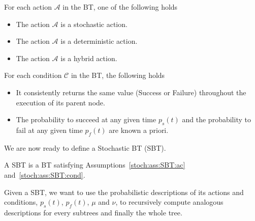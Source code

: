 \begin{assumption}
\label{stoch:ass:SBT:ac}
For each action $\mathcal{A}$ in the BT, one of the following holds
\begin{itemize}
\item The action $\mathcal{A}$ is a stochastic action.
\item The action $\mathcal{A}$ is a deterministic action. 
\item The action $\mathcal{A}$ is a hybrid action. 
\end{itemize} 
\end{assumption}


\begin{assumption}
\label{stoch:ass:SBT:cond}
For each condition $\mathcal{C}$ in the BT, the following holds
\begin{itemize}
\item It consistently returns the same value (Success or Failure) throughout the execution of its parent node.
\item The probability to succeed at any given time $p_s(t)$ and the probability to fail at any given time $p_f(t)$ are known a priori. 
\end{itemize} 
\end{assumption}
We are now ready to define a Stochastic BT (SBT).
\begin{definition}
A SBT is a BT satisfying Assumptions~\ref{stoch:ass:SBT:ac} and~\ref{stoch:ass:SBT:cond}.
\end{definition}


Given a SBT, we want to use the probabilistic descriptions of its actions and conditions, $p_s(t)$, $p_f(t)$, $\mu$ and $\nu$, to recursively compute analogous descriptions for every subtrees and finally the whole tree. %

%
%


